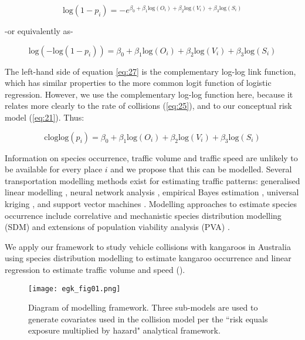 \begin{equation} \label{eq:26}
\text{log}(1-p_i)=-e^{\beta_0+\beta_1\text{log}(O_i)+\beta_2\text{log}(V_i)+\beta_3\text{log}(S_i)}
\end{equation}

\begin{center}
-or equivalently as- 
\end{center}

\begin{equation} \label{eq:27}
\text{log}(-\text{log}(1-p_i))=\beta_0+\beta_1\text{log}(O_i)+\beta_2\text{log}(V_i)+\beta_3\text{log}(S_i)
\end{equation}

The left-hand side of equation \ref{eq:27} is the complementary log-log link function, which has similar properties to the more common logit function of logistic regression. However, we use the complementary log-log function here, because it relates more clearly to the rate of collisions (\ref{eq:25}), and to our conceptual risk model (\ref{eq:21}). Thus: 

\begin{equation} \label{eq:28}
\text{cloglog}(p_i)=\beta_0+\beta_1\text{log}(O_i)+\beta_2\text{log}(V_i)+\beta_3\text{log}(S_i)
\end{equation}

Information on species occurrence, traffic volume and traffic speed are unlikely to be available for every place $i$ and we propose that this can be modelled. Several transportation modelling methods exist for estimating traffic patterns: generalised linear modelling \citep{seav00,zhao01}, neural network analysis \citep{dudd13}, empirical Bayes estimation \citep{yang02}, universal kriging \citep{eom06,selb13}, and support vector machines \citep{cast09}. Modelling approaches to estimate species occurrence include correlative \citep{guis05,elit09} and mechanistic \citep{kear09} species distribution modelling (SDM) and extensions of population viability analysis (PVA) \citep{gilp86,shaf90}.

We apply our framework to study vehicle collisions with kangaroos in Australia using species distribution modelling to estimate kangaroo occurrence and linear regression to estimate traffic volume and speed ().

\begin{figure*}[htp]
  \centering
  \texttt{[image: egk\_fig01.png]}
  \caption[Diagram of modelling framework]{Diagram of modelling framework. Three sub-models are used to generate covariates used in the collision model per the ``risk equals exposure multiplied by hazard" analytical framework.}
  \label{egk_framework}
\end{figure*}
 
